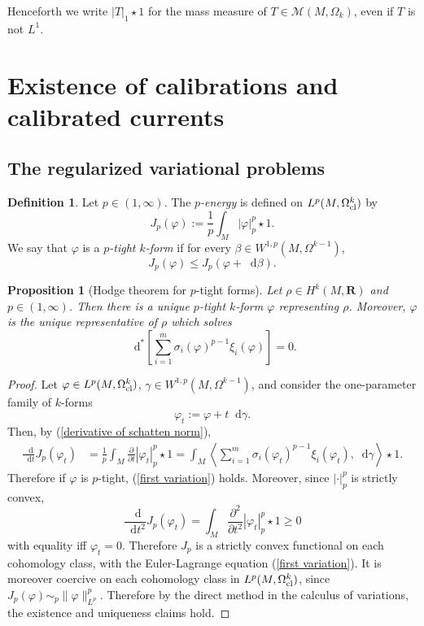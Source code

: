 \documentclass[reqno,11pt]{amsart}
\newcommand{\RR}{\mathbf{R}}
\newcommand*\dif{\mathop{}\!\mathrm{d}}
\newcommand{\dfn}[1]{\emph{#1}\index{#1}}
\newtheorem{proposition}[theorem]{Proposition}
\theoremstyle{definition}
\newtheorem{definition}[theorem]{Definition}
\numberwithin{equation}{section}
\begin{document}
Henceforth we write $|T|_1 \star 1$ for the mass measure of $T \in \mathcal M(M, \Omega_k)$, even if $T$ is not $L^1$.

\section{Existence of calibrations and calibrated currents}
\subsection{The regularized variational problems}
\begin{definition}
Let $p \in (1, \infty)$.
The \dfn{$p$-energy} is defined on $L^p(M, \Omega^k_{\rm cl})$ by 
$$J_p(\varphi) := \frac{1}{p} \int_M |\varphi|_p^p \star 1.$$
We say that $\varphi$ is a \dfn{$p$-tight $k$-form} if for every $\beta \in W^{1, p}(M, \Omega^{k - 1})$,
$$J_p(\varphi) \leq J_p(\varphi + \dif \beta).$$
\end{definition}

\begin{proposition}[Hodge theorem for $p$-tight forms]
Let $\rho \in H^k(M, \RR)$ and $p \in (1, \infty)$.
Then there is a unique $p$-tight $k$-form $\varphi$ representing $\rho$.
Moreover, $\varphi$ is the unique representative of $\rho$ which solves
\begin{equation}\label{first variation}
\dif^*\left[\sum_{i=1}^m \sigma_i(\varphi)^{p - 1} \xi_i(\varphi)\right] = 0.
\end{equation}
\end{proposition}
\begin{proof}
Let $\varphi \in L^p(M, \Omega^k_{\rm cl})$, $\gamma \in W^{1, p}(M, \Omega^{k - 1})$, and consider the one-parameter family of $k$-forms
$$\varphi_t := \varphi + t \dif \gamma.$$
Then, by (\ref{derivative of schatten norm}),
\begin{align*}
\frac{\dif}{\dif t} J_p(\varphi_t)
&= \frac{1}{p} \int_M \frac{\partial}{\partial t} |\varphi_t|_p^p \star 1
= \int_M \left\langle \sum_{i=1}^m \sigma_i(\varphi_t)^{p - 1} \xi_i(\varphi_t), \dif \gamma\right\rangle \star 1.
\end{align*}
Therefore if $\varphi$ is $p$-tight, (\ref{first variation}) holds.
Moreover, since $|\cdot|_p^p$ is strictly convex, 
$$\frac{\dif}{\dif t^2} J_p(\varphi_t) = \int_M \frac{\partial^2}{\partial t^2} |\varphi_t|_p^p \star 1 \geq 0$$
with equality iff $\varphi_t = 0$.
Therefore $J_p$ is a strictly convex functional on each cohomology class, with the Euler-Lagrange equation (\ref{first variation}).
It is moreover coercive on each cohomology class in $L^p(M, \Omega^k_{\rm cl})$, since $J_p(\varphi) \sim_p \|\varphi\|_{L^p}^p$.
Therefore by the direct method in the calculus of variations, the existence and uniqueness claims hold.
\end{proof}
\end{document}
